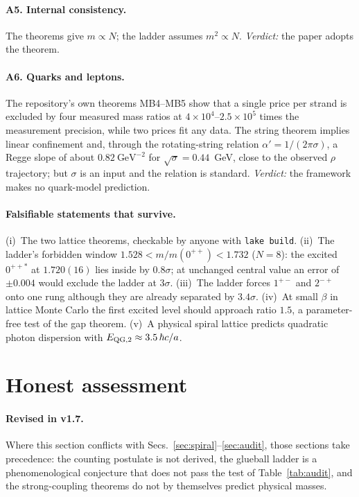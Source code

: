 \documentclass[aps,prd,preprint,superscriptaddress,amsmath,amssymb]{revtex4-2}
\begin{document}
\paragraph{A5. Internal consistency.}  The theorems give $m\propto N$; the
ladder assumes $m^2\propto N$.  \emph{Verdict:} the paper adopts the theorem.

\paragraph{A6. Quarks and leptons.}  The repository's own theorems MB4--MB5
show that a single price per strand is excluded by four measured mass ratios
at $4\times10^4$--$2.5\times10^5$ times the measurement precision, while two
prices fit any data.  The string theorem implies linear confinement and,
through the rotating-string relation $\alpha'=1/(2\pi\sigma)$, a Regge slope of
about $0.82~\text{GeV}^{-2}$ for $\sqrt\sigma=0.44$~GeV, close to the observed
$\rho$ trajectory; but $\sigma$ is an input and the relation is standard.
\emph{Verdict:} the framework makes no quark-model prediction.

\paragraph{Falsifiable statements that survive.}  (i)~The two lattice
theorems, checkable by anyone with \texttt{lake build}.  (ii)~The ladder's
forbidden window $1.528<m/m(0^{++})<1.732$ ($N=8$): the excited $0^{++*}$ at
$1.720(16)$ lies inside by $0.8\sigma$; at unchanged central value an error of
$\pm0.004$ would exclude the ladder at $3\sigma$.  (iii)~The ladder forces
$1^{+-}$ and $2^{-+}$ onto one rung although they are already separated by
$3.4\sigma$.  (iv)~At small $\beta$ in lattice Monte Carlo the first excited
level should approach ratio $1.5$, a parameter-free test of the gap theorem.
(v)~A physical spiral lattice predicts quadratic photon dispersion with
$E_{\rm QG,2}\approx3.5\,\hbar c/a$.

\section{Honest assessment}
\label{sec:honest}

\paragraph{Revised in v1.7.}  Where this section conflicts with Secs.~\ref{sec:spiral}--\ref{sec:audit}, those sections take precedence: the counting postulate is not derived, the glueball ladder is a phenomenological conjecture that does not pass the test of Table~\ref{tab:audit}, and the strong-coupling theorems do not by themselves predict physical masses.
\end{document}
